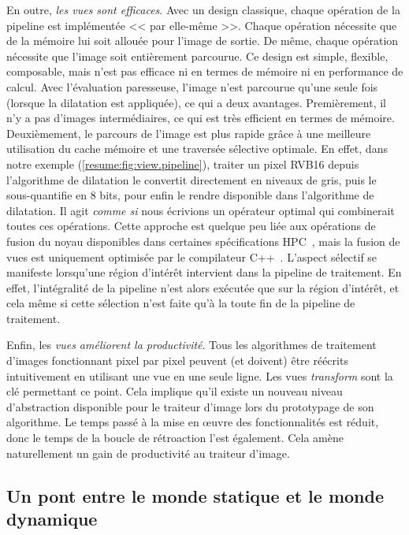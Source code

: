 En outre, \emph{les vues sont efficaces}. Avec un design classique, chaque opération de la pipeline est implémentée <<
par elle-même >>. Chaque opération nécessite que de la mémoire lui soit allouée pour l'image de sortie. De même, chaque
opération nécessite que l'image soit entièrement parcourue. Ce design est simple, flexible, composable, mais n'est pas
efficace ni en termes de mémoire ni en performance de calcul. Avec l'évaluation paresseuse, l'image n'est parcourue
qu'une seule fois (lorsque la dilatation est appliquée), ce qui a deux avantages. Premièrement, il n'y a pas d'images
intermédiaires, ce qui est très efficient en termes de mémoire. Deuxièmement, le parcours de l'image est plus rapide
grâce à une meilleure utilisation du cache mémoire et une traversée sélective optimale. En effet, dans notre exemple
(\cref{resume:fig:view.pipeline}), traiter un pixel RVB16 depuis l'algorithme de dilatation le convertit directement en
niveaux de gris, puis le sous-quantifie en 8 bits, pour enfin le rendre disponible dans l'algorithme de dilatation. Il
agit \emph{comme si} nous écrivions un opérateur optimal qui combinerait toutes ces opérations. Cette approche est
quelque peu liée aux opérations de fusion du noyau disponibles dans certaines spécifications
HPC~\parencite{openvx.2019}, mais la fusion de vues est uniquement optimisée par le compilateur
C++~\parencite{brown.2018.ranges}. L'aspect sélectif se manifeste lorsqu'une région d'intérêt intervient dans la
pipeline de traitement. En effet, l'intégralité de la pipeline n'est alors exécutée que sur la région d'intérêt, et cela
même si cette sélection n'est faite qu'à la toute fin de la pipeline de traitement.

Enfin, les \emph{vues améliorent la productivité}. Tous les algorithmes de traitement d'images fonctionnant pixel par
pixel peuvent (et doivent) être réécrits intuitivement en utilisant une vue en une seule ligne. Les vues
\emph{transform} sont la clé permettant ce point. Cela implique qu'il existe un nouveau niveau d'abstraction disponible
pour le traiteur d'image lors du prototypage de son algorithme. Le temps passé à la mise en \oe{}uvre des
fonctionnalités est réduit, donc le temps de la boucle de rétroaction l'est également. Cela amène naturellement un gain
de productivité au traiteur d'image.


\subsection*{Un pont entre le monde statique et le monde dynamique}


